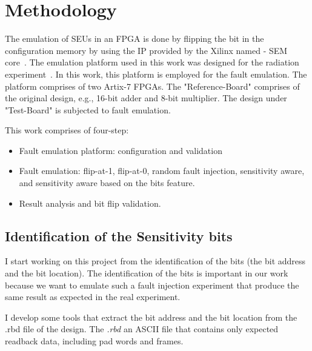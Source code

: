 \section{Methodology}
\label{Methodology}

The emulation of SEUs in an FPGA is done by flipping the bit in the configuration memory by using the IP provided by the Xilinx named - SEM core~\citep{xilinx}. The emulation platform used in this work was designed for the radiation experiment~\citep{hobeika2014multi}. In this work, this platform is employed for the fault emulation. The platform comprises of two Artix-7 FPGAs. The "Reference-Board" comprises of the original design, e.g., 16-bit adder and 8-bit multiplier. The design under "Test-Board" is subjected to fault emulation.  



This work comprises of four-step:
\begin{itemize}
\item{Fault emulation platform: configuration and validation}
\item{Fault emulation: flip-at-1, flip-at-0, random fault injection, sensitivity aware, and sensitivity aware based on the bits feature}.
\item{Result analysis and bit flip validation}.
\end{itemize}


\subsection{Identification of the Sensitivity bits}
\label{SE-bits}

I start working on this project from the identification of the bits (the bit address and the bit location). The identification of the bits is important in our work because we want to emulate such a fault injection experiment that produce the same result as expected in the real experiment.

I develop some tools that extract the bit address and the bit location from the .rbd file of the design. The \textit{.rbd} an ASCII file that contains only expected readback data, including pad words and frames.

